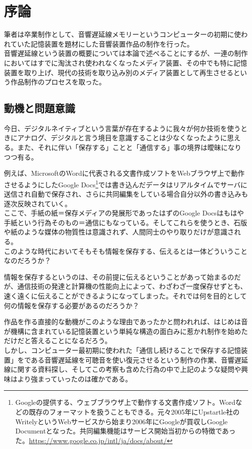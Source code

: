 \chapter{序論}\label{ux5e8fux8ad6}

筆者は卒業制作として、音響遅延線メモリーというコンピューターの初期に使われていた記憶装置を題材にした音響装置作品の制作を行った。\\
音響遅延線という装置の概要については本論で述べることにするが、一連の制作においてはすでに淘汰され使われなくなったメディア装置、その中でも特に記憶装置を取り上げ、現代の技術を取り込み別のメディア装置として再生させるという作品制作のプロセスを取った。

\section{動機と問題意識}\label{ux52d5ux6a5fux3068ux554fux984cux610fux8b58}

今日、デジタルネイティブという言葉が存在するように我々が何か技術を使うときにアナログ、デジタルと言う境目を意識することは少なくなったように思える。また、それに伴い「保存する」ことと「通信する」事の境界は曖昧になりつつ有る。

例えば、MicrosoftのWordに代表される文書作成ソフトをWebブラウザ上で動作させるようにしたGoogle
Docs\footnote{Googleの提供する、ウェブブラウザ上で動作する文書作成ソフト。Wordなどの既存のフォーマットを扱うこともできる。元々2005年にUpstartle社のWritelyというWebサービスから始まり2006年にGoogleが買収しGoogle
  Documentとなった。共同編集機能はサービス開始当初からの特徴であった。\url{https://www.google.co.jp/intl/ja/docs/about/}}では書き込んだデータはリアルタイムでサーバに送信され自動で保存され、さらに共同編集をしている場合自分以外の書き込みも逐次反映されていく。\\
ここで、手紙の紙＝保存メディアの発展形であったはずのGoogle
Docsはもはや手紙という行為そのもの＝通信にもなっている。そしてこれらを使うとき、石版や紙のような媒体の物質性は意識されず、人間同士のやり取りだけが意識される。\\
このような時代においてそもそも情報を保存する、伝えるとは一体どういうことなのだろうか？

情報を保存するというのは、その前提に伝えるということがあって始まるのだが、通信技術の発達と計算機の性能向上によって、わざわざ一度保存せずとも、速く遠くに伝えることができるようになってしまった。それでは何を目的として何の情報を保存する必要があるのだろうか？

作品を作る直接的な動機がこのような理由であったかと問われれば、はじめは音が機構に含まれている記憶装置という単純な構造の面白みに惹かれ制作を始めただけだと答えることになるだろう。\\
しかし、コンピューター最初期に使われた「通信し続けることで保存する記憶装置」をである音響遅延線を可聴音を使い復元させるという制作の作業、音響遅延線に関する資料探し、そしてこの考察も含めた行為の中で上記のような疑問や興味はより強まっていったのは確かである。

